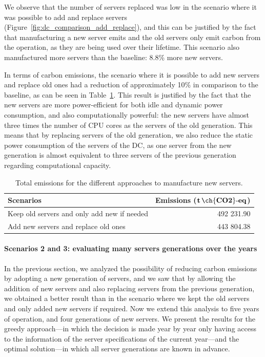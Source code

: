 We observe that the number of servers replaced was low in the scenario where it was possible to add and replace servers (Figure~\ref{fig:dc_comparison_add_replace}), and this can be justified by the fact that manufacturing a new server emits  and the old servers only emit carbon from the operation, as they are being used over their lifetime. This scenario also manufactured more servers than the baseline: 8.8\% more new servers.


In terms of carbon emissions, the scenario where it is possible to add new servers and replace old ones had a reduction of approximately 10\% in comparison to the baseline, as can be seen in Table~\ref{tab:co2_emissions_add_vs_replace}. This result is justified by the fact that the new servers are more power-efficient for both idle and dynamic power consumption, and also computationally powerful: the new servers have almost three times the number of CPU cores as the servers of the old generation. This means that by replacing servers of the old generation, we also reduce the static power consumption of the servers of the DC, as one server from the new generation is almost equivalent to three servers of the previous generation regarding computational capacity.
  
\begin{table}[!ht]    
\caption{Total emissions for the different approaches to manufacture new servers.}\label{tab:co2_emissions_add_vs_replace} \centering
\begin{tabular}{|l|r|}
  \hline  
  \textbf{Scenarios} & \textbf{Emissions ($\mathbf{t\,\ch{CO2}\text{-}eq}$)}   \\
  \hline  
   Keep old servers and only add new if needed  &   492 231.90 \\  
  \hline
   Add new servers and replace old ones         &   443 804.38  \\
  \hline
  
\end{tabular}
\end{table}

\paragraph{Scenarios 2 and 3: evaluating many servers generations over the years} 
\label{sec:results_experiments_extension_scenario_2_3}

In the previous section, we analyzed the possibility of reducing carbon emissions by adopting a new generation of servers, and we saw that by allowing the addition of new servers and also replacing servers from the previous generation, we obtained a better result than in the scenario where we kept the old servers and only added new servers if required. Now we extend this analysis to five years of operation, and four generations of new servers. We present the results for the greedy approach---in which the decision is made year by year only having access to the information of the server specifications of the current year---and the optimal solution---in which all server generations are known in advance.

